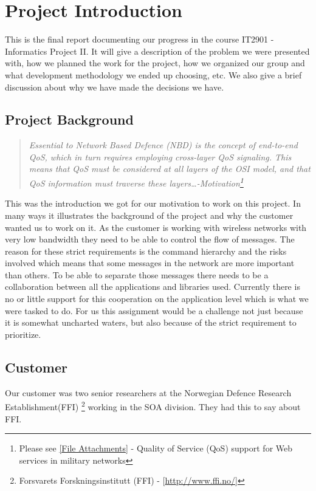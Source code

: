 \section{Project Introduction}\label{Project Introduction}
    This is the final report documenting our progress in the course IT2901 - Informatics Project II. It will give a description of the problem we were presented with, how we planned the work for the project, how we organized our group and what development methodology we ended up choosing, etc. We also give a brief discussion about why we have made the decisions we have.
    
    \subsection{Project Background}\label{Project Background}
    \begin{quotation}
    \em Essential to Network Based Defence (NBD) is the concept of end-to-end QoS, which in turn requires employing cross-layer QoS signaling. This means that QoS must be considered at all layers of the OSI model, and that QoS information must traverse these layers\ldots \textnormal{-Motivation\footnote{Please see \ref{File Attachments} - Quality of Service (QoS) support for Web services in military networks}}
    \end{quotation}
    This was the introduction we got for our motivation to work on this project. In many ways it illustrates the background of the project and why the customer wanted us to work on it. As the customer is working with wireless networks with very low bandwidth they need to be able to control the flow of messages. The reason for these strict requirements is the command hierarchy and the risks involved which means that some messages in the network are more important than others. To be able to separate those messages there needs to be a collaboration between all the applications and libraries used. Currently there is no or little support for this cooperation on the application level which is what we were tasked to do. For us this assignment would be a challenge not just because it is somewhat uncharted waters, but also because of the strict requirement to prioritize.

    \subsection{Customer}\label{Customer}
    Our customer was two senior researchers at the Norwegian Defence Research Establishment(FFI)    \footnote{Forsvarets Forskningsinstitutt (FFI) - [\url{http://www.ffi.no/}]} working in the SOA division. They had this to say about FFI.

